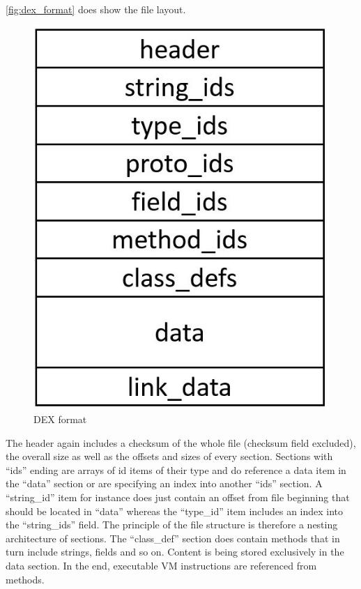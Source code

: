 \autoref{fig:dex_format} does show the file layout.
\begin{figure}[htb]
  \centering
  \includegraphics[scale=0.3]{figures/dex_format}
  \caption[DEX format]{DEX format}
  \label{fig:dex_format}
\end{figure}
The header again includes a checksum of the whole file (checksum
field excluded), the overall size as well as the offsets and sizes
of every section. Sections with ``ids'' ending are arrays of
id items of their type and do reference
a data item in the ``data'' section or are specifying
an index into another ``ids'' section. A ``string\_id'' item for
instance does just contain an offset from file beginning
that should be located in ``data'' whereas the ``type\_id'' item
includes an index into the ``string\_ids'' field. The principle
of the file structure is therefore a nesting architecture of
sections. The ``class\_def'' section does contain methods that
in turn include strings, fields and so on. Content is being
stored exclusively in the data section. In the end,
executable VM instructions are referenced from methods.


